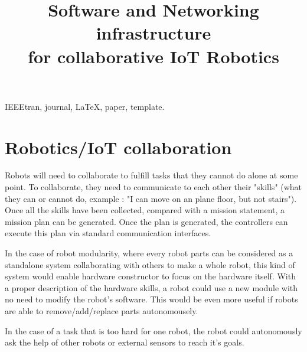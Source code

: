 \documentclass[conference]{IEEEtran}
\begin{document}
\title{Software and Networking infrastructure \\for collaborative IoT Robotics}

\author{
\and
{}
\and
{}
}

\maketitle

\begin{abstract}

\end{abstract}

\begin{IEEEkeywords}
IEEEtran, journal, \LaTeX, paper, template.
\end{IEEEkeywords}

\IEEEpeerreviewmaketitle

\section{Robotics/IoT collaboration}

Robots will need to collaborate to fulfill tasks that they cannot do alone at some point.
To collaborate, they need to communicate to each other their "skills" (what they can or cannot do, example : "I can move on an plane floor, but not stairs").
Once all the skills have been collected, compared with a mission statement, a mission plan can be generated.
Once the plan is generated, the controllers can execute this plan via standard communication interfaces.

In the case of robot modularity, where every robot parts can be considered as a standalone system collaborating with others to make a whole robot, this kind of system would enable hardware constructor to focus on the hardware itself.
With a proper description of the hardware skills, a robot could use a new module with no need to modify the robot's software.
This would be even more useful if robots are able to remove/add/replace parts autonomousely.

In the case of a task that is too hard for one robot, the robot could autonomously ask the help of other robots or external sensors to reach it's goals.
\end{document}
